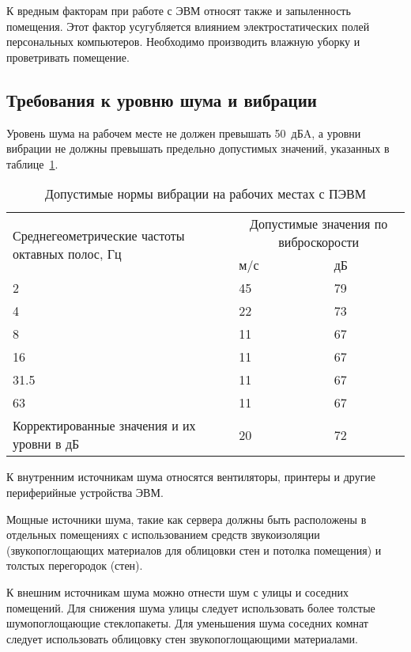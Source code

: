 К вредным факторам при работе с ЭВМ относят также и запыленность помещения.
Этот фактор усугубляется влиянием электростатических полей персональных
компьютеров. Необходимо производить влажную уборку и проветривать помещение.

\subsection{Требования к уровню шума и вибрации}
Уровень шума на рабочем месте не должен превышать 50~дБA, а уровни вибрации не
должны превышать предельно допустимых значений, указанных в
таблице~\ref{tab:vibration}.

\begin{table}[h]
  \centering
  \caption{Допустимые нормы вибрации на рабочих местах с ПЭВМ}
  \label{tab:vibration}
  \begin{tabular}{|p{}|p{}|p{}|}
    \hline
    \multirow{2}{\hsize}{Среднегеометрические частоты октавных полос, Гц} &
    \multicolumn{2}{|c|}{Допустимые значения по виброскорости} \\
    \cline{2-3}
    & м/с & дБ \\
    \hline
    2 & 45 & 79 \\
    \hline
    4 & 22 & 73 \\
    \hline
    8 & 11 & 67\\
    \hline
    16 & 11 & 67 \\
    \hline
    31.5 & 11 & 67 \\
    \hline
    63 & 11 & 67 \\
    \hline
    Корректированные значения и их уровни в дБ & 20 & 72 \\
    \hline
  \end{tabular}
\end{table}

К внутренним источникам шума относятся вентиляторы, принтеры и другие
периферийные устройства ЭВМ.

Мощные источники шума, такие как сервера должны быть расположены в отдельных
помещениях с использованием средств звукоизоляции (звукопоглощающих материалов
для облицовки стен и потолка помещения) и толстых перегородок (стен).

К внешним источникам шума можно отнести шум с улицы и соседних помещений. Для
снижения шума улицы следует использовать более толстые шумопоглощающие
стеклопакеты. Для уменьшения шума соседних комнат следует использовать облицовку
стен звукопоглощающими материалами.

